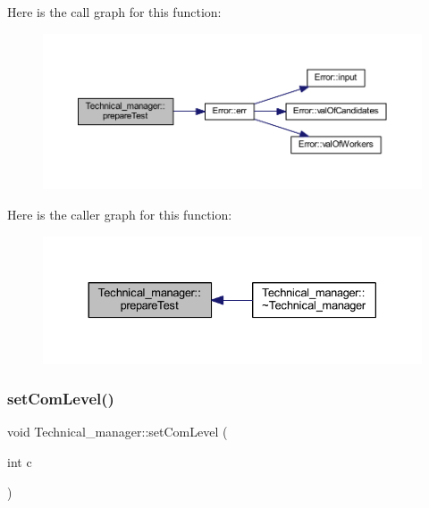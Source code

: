 Here is the call graph for this function\+:
\nopagebreak
\begin{figure}[H]
\begin{center}
\leavevmode
\includegraphics[width=350pt]{class_technical__manager_aba0df90b5aa9389fd90816fe4652c2ad_cgraph}
\end{center}
\end{figure}
Here is the caller graph for this function\+:
\nopagebreak
\begin{figure}[H]
\begin{center}
\leavevmode
\includegraphics[width=330pt]{class_technical__manager_aba0df90b5aa9389fd90816fe4652c2ad_icgraph}
\end{center}
\end{figure}
\hypertarget{class_technical__manager_a1c88a32f65f12e4302a1cab1cf804957}{}\label{class_technical__manager_a1c88a32f65f12e4302a1cab1cf804957} 
\subsubsection{\texorpdfstring{set\+Com\+Level()}{setComLevel()}}
{\footnotesize\ttfamily void Technical\+\_\+manager\+::set\+Com\+Level (\begin{DoxyParamCaption}\item[{int}]{c }\end{DoxyParamCaption})\hspace{0.3cm}{\ttfamily [inline]}}

